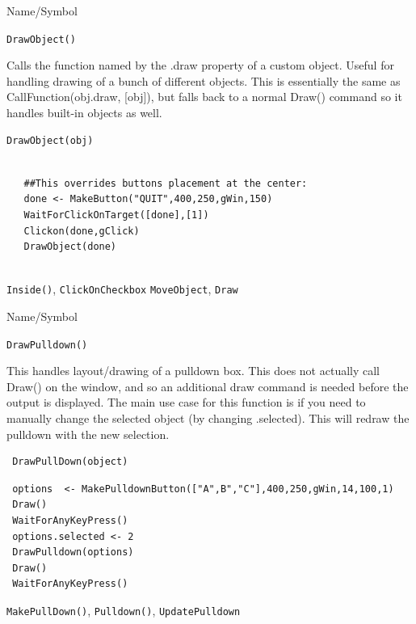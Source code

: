 \begin{desc}{Name/Symbol}
\item[Name/Symbol]	\verb+DrawObject()+

\item[Description] Calls the function named by the  .draw property of a custom object.  Useful for handling drawing of a bunch of different objects. This is essentially the same as CallFunction(obj.draw, [obj]), but falls back to a normal Draw() command so it handles built-in objects as well.

\item[Usage]
\begin{verbatim}
DrawObject(obj)	
\end{verbatim}

\item[Example]	


\begin{verbatim}
  
   ##This overrides buttons placement at the center:  
   done <- MakeButton("QUIT",400,250,gWin,150)
   WaitForClickOnTarget([done],[1])
   Clickon(done,gClick)
   DrawObject(done)
    
\end{verbatim}

\item[See Also]	
\verb+Inside()+, \verb+ClickOnCheckbox+ \verb+MoveObject+, \verb+Draw+
\end{desc}




\begin{desc}{Name/Symbol}
\item[Name/Symbol]  	\verb+DrawPulldown()+

\item[Description]	
This handles layout/drawing of a pulldown box. This does not actually call Draw() on the window, and so an additional draw command is needed before the output is displayed.  The main use case for this function is if you need to manually change the selected object (by changing .selected). This will redraw the pulldown with the new selection.  

\item[Usage]
\begin{verbatim}
 DrawPullDown(object)
 \end{verbatim}

\item[Example]      	
\begin{verbatim}
 options  <- MakePulldownButton(["A",B","C"],400,250,gWin,14,100,1)
 Draw()
 WaitForAnyKeyPress()
 options.selected <- 2
 DrawPulldown(options)
 Draw()
 WaitForAnyKeyPress()
\end{verbatim}

\item[See Also]	\verb+MakePullDown()+, \verb+Pulldown()+, \verb+UpdatePulldown+
\end{desc}



